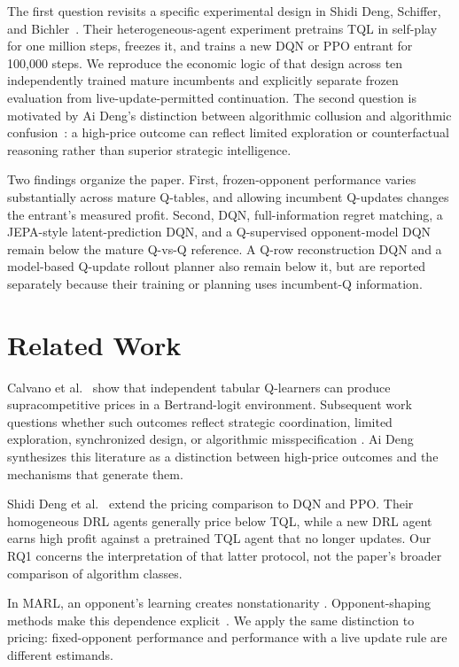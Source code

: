 \documentclass[11pt]{article}
\begin{document}
The first question revisits a specific experimental design in Shidi Deng,
Schiffer, and Bichler~\cite{shidideng2025}. Their heterogeneous-agent experiment
pretrains TQL in self-play for one million steps, freezes it, and trains a new
DQN or PPO entrant for 100,000 steps. We reproduce the economic logic of that
design across ten independently trained mature incumbents and explicitly
separate frozen evaluation from live-update-permitted continuation. The second
question is motivated by Ai Deng's distinction between algorithmic collusion
and algorithmic confusion~\cite{aideng2026}: a high-price outcome can reflect
limited exploration or counterfactual reasoning rather than superior strategic
intelligence.

Two findings organize the paper. First, frozen-opponent performance varies
substantially across mature Q-tables, and allowing incumbent Q-updates changes
the entrant's measured profit. Second, DQN, full-information regret matching,
a JEPA-style latent-prediction DQN, and a Q-supervised opponent-model DQN
remain below the mature Q-vs-Q reference. A Q-row reconstruction DQN and a
model-based Q-update rollout planner also remain below it, but are reported
separately because their training or planning uses incumbent-Q information.

\section{Related Work}

Calvano et al.~\cite{calvano2020} show that independent tabular Q-learners can
produce supracompetitive prices in a Bertrand-logit environment. Subsequent
work questions whether such outcomes reflect strategic coordination, limited
exploration, synchronized design, or algorithmic misspecification
\cite{abada2024,carissimo2025}. Ai Deng~\cite{aideng2026} synthesizes this
literature as a distinction between high-price outcomes and the mechanisms
that generate them.

Shidi Deng et al.~\cite{shidideng2025} extend the pricing comparison to DQN and
PPO. Their homogeneous DRL agents generally price below TQL, while a new DRL
agent earns high profit against a pretrained TQL agent that no longer updates.
Our RQ1 concerns the interpretation of that latter protocol, not the paper's
broader comparison of algorithm classes.

In MARL, an opponent's learning creates nonstationarity
\cite{hernandez2017,papoudakis2019}. Opponent-shaping methods make this
dependence explicit~\cite{foerster2018,fung2024}. We apply the same distinction
to pricing: fixed-opponent performance and performance with a live update rule
are different estimands.
\end{document}
